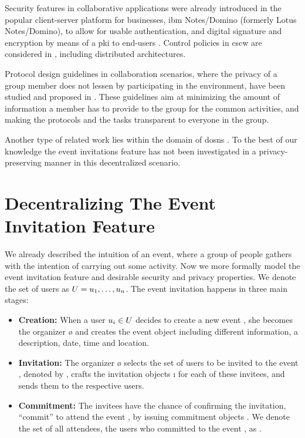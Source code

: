 Security features in collaborative applications were already introduced in the popular 
client-server platform for businesses, \acs*{ibm} Notes/Domino (formerly Lotus Notes/Domino), 
to allow for usable authentication, and digital signature and encryption by means 
of a \Ac{pki} to end-users \cite{Zurko05}. Control policies in \Ac{cscw} are considered 
in \cite{RoddenB91}, including distributed architectures.

Protocol design guidelines in collaboration scenarios, where the privacy 
of a group member does not lessen by participating in the 
environment, have been studied and proposed in \cite{KimK06a}. These guidelines aim 
at minimizing the amount of information a member has to provide to the group for 
the common activities, and making the protocols and 
the tasks transparent to everyone in the group.

Another type of related work lies within the domain of \Acp{dosn} \cite{BadenBSBS09,CutilloMS09,FamulariH12}. To the best of 
our knowledge the event invitations feature has not been investigated in a privacy-preserving 
manner in this decentralized scenario.

\section{Decentralizing The Event Invitation Feature}
	\label{section:event-invitations-dosns:decentralizing-the-event-invitation-feature}

We already described the intuition of   
an event, where a group of people gathers with the intention of carrying 
out some activity. Now we more formally model the event invitation
feature and desirable security and privacy properties. 
%
We denote the set of users as $U{} = u_1, \dots, u_n$. 
The event invitation happens in three main stages: 

\begin{itemize}
	
	\item \textbf{Creation:}
		When a user $\u[i] \in \U{}$ decides to create a new event \e{}, she becomes 
		the organizer \o{} and creates the event object \eo{} including different 
		information, \eg a description, date, time and location.
	
	\item \textbf{Invitation:}
		The organizer \o{} selects the set of users to be invited to the event \e{}, 
		denoted by \I{}, crafts the invitation objects \i{} for each of these invitees, 
		and sends them to the respective users. 
	
	\item \textbf{Commitment:}
		The invitees \I{} have the chance of confirming the invitation, \ie ``commit'' 
		to attend the event \e{}, by issuing commitment objects \cm{}. We denote 
		the set of all attendees, \ie the users who committed to the event \e{},
		as \C{}.
	
\end{itemize}

